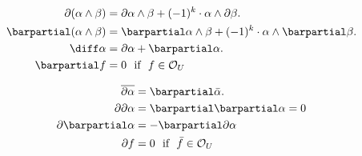 \begin{minipage}{0.46\textwidth}
    \begin{align}
        \partial (\alpha \wedge \beta) &= \partial \alpha \wedge \beta + (-1)^k \cdot \alpha \wedge \partial\beta. \\
        \barpartial (\alpha \wedge \beta) &= \barpartial \alpha \wedge \beta + (-1)^k \cdot \alpha \wedge \barpartial\beta. \\
        \diff \alpha &= \partial \alpha + \barpartial \alpha. \\
        \barpartial f&=0 \ \ \text{if} \ \ f \in \mathcal{O}_U \label{barparial_holomorphic_zero}
    \end{align}
\end{minipage}
\begin{minipage}{0.46\textwidth}
    \begin{align}
        \overline{\partial \alpha}&=\barpartial \bar{\alpha}. \\
        \partial \partial \alpha&=\barpartial \barpartial \alpha=0 \label{eqbarpartial2} \\
        \partial \barpartial \alpha &= -\barpartial \partial \alpha \\
        \partial f&=0 \ \ \text{if} \ \ \bar{f} \in \mathcal{O}_U
    \end{align}
\end{minipage}



